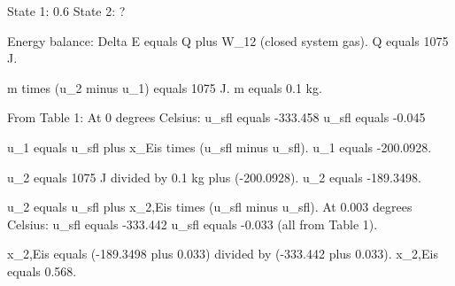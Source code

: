 State 1: 0.6  
State 2: ?  

Energy balance:  
Delta E equals Q plus W_12 (closed system gas).  
Q equals 1075 J.  

m times (u_2 minus u_1) equals 1075 J.  
m equals 0.1 kg.  

From Table 1:  
At 0 degrees Celsius:  
u_sfl equals -333.458  
u_sfl equals -0.045  

u_1 equals u_sfl plus x_Eis times (u_sfl minus u_sfl).  
u_1 equals -200.0928.  

u_2 equals 1075 J divided by 0.1 kg plus (-200.0928).  
u_2 equals -189.3498.  

u_2 equals u_sfl plus x_2,Eis times (u_sfl minus u_sfl).  
At 0.003 degrees Celsius:  
u_sfl equals -333.442  
u_sfl equals -0.033  
(all from Table 1).  

x_2,Eis equals (-189.3498 plus 0.033) divided by (-333.442 plus 0.033).  
x_2,Eis equals 0.568.